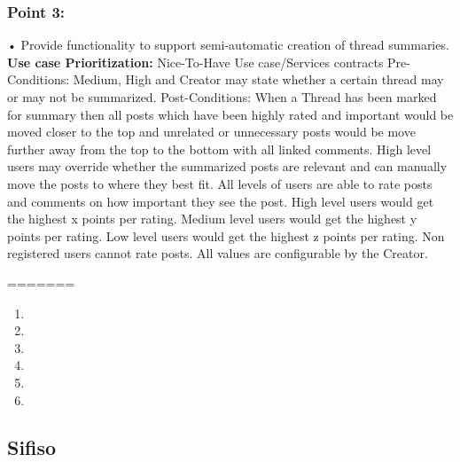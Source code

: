 \documentclass[11pt]{article}
\begin{document}
\subsubsection{Point 3:}
•	Provide functionality to support semi-automatic creation of thread summaries.
\newline
\textbf{Use case Prioritization:} Nice-To-Have
Use case/Services contracts
\newline
Pre-Conditions:
\newline
Medium, High and Creator may state whether a certain thread may or may not be summarized.
\newline
Post-Conditions:
When a Thread has been marked for summary then all posts which have been highly rated and important would be moved closer to the top and unrelated or unnecessary posts would be move further away from the top to the bottom with all linked comments. High level users may override whether the summarized posts are relevant and can manually move the posts to where they best fit.
\newline
All levels of users are able to rate posts and comments on how important they see the post.
\newline
High level users would get the highest x points per rating.
Medium level users would get the highest y points per rating.
Low level users would get the highest z points per rating.
Non registered users cannot rate posts.
\newline
All values are configurable by the Creator.
\newline

=======
\begin{enumerate}
\item 
\item 
\item 
\item 
\item 
\item 
\end{enumerate}

\newpage

\subsection{Sifiso}
\end{document}
